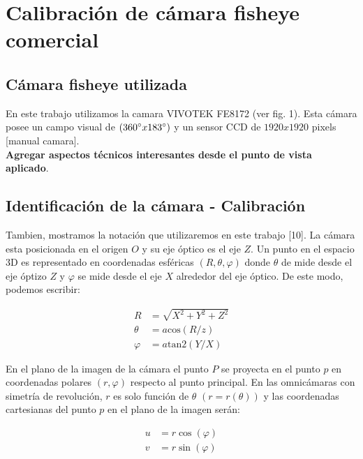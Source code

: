 \documentclass[12pt,a4paper]{article}
\begin{document}
\section{Calibración de cámara fisheye comercial}

\subsection{Cámara fisheye utilizada}

En este trabajo utilizamos la camara VIVOTEK FE8172 (ver fig. 1). Esta cámara posee un campo visual de $(360\degree x 183\degree)$ y un sensor CCD de $1920 x 1920$ pixels [manual camara].
\\\textbf{Agregar aspectos técnicos interesantes desde el punto de vista aplicado}.

\subsection{Identificación de la cámara - Calibración}

Tambien, mostramos la notación que utilizaremos en este trabajo [10]. La cámara esta posicionada en el origen $O$ y su eje óptico es el eje $Z$. Un punto en el espacio 3D es representado en coordenadas esféricas $(R,\theta,\varphi)$ donde $\theta$ de mide desde el eje óptizo $Z$ y $\varphi$ se mide desde el eje $X$ alrededor del eje óptico. De este modo, podemos escribir:

\begin{equation}
  \begin{split}
    R & = \sqrt{X^2+Y^2+Z^2}
    \\
    \theta & = a \text{cos} \left(R/z\right)
    \\
    \varphi & = a \text{tan2} \left(Y/X\right)
  \end{split}
\end{equation}

En el plano de la imagen de la cámara el punto $P$ se proyecta en el punto $p$ en coordenadas polares $(r,\varphi)$ respecto al punto principal. En las omnicámaras con simetría de revolución, $r$ es solo función de $\theta$ $(r=r(\theta))$ y las coordenadas cartesianas del punto $p$ en el plano de la imagen serán:

\begin{equation}
  \begin{split}
    u & = r \cos\left(\varphi\right)
    \\
    v & = r \sin\left(\varphi\right)
  \end{split}
\end{equation}
\end{document}
